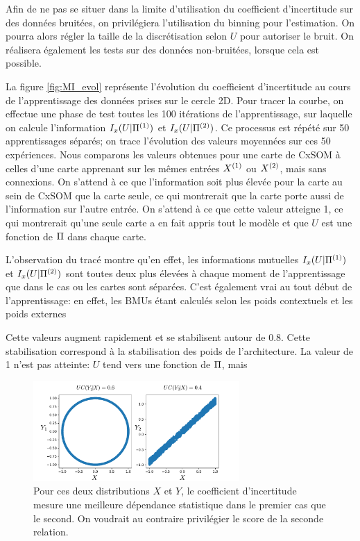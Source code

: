 Afin de ne pas se situer dans la limite d'utilisation du coefficient d'incertitude sur des données bruitées, on privilégiera l'utilisation du binning pour l'estimation. On pourra alors régler la taille de la discrétisation selon $U$ pour autoriser le bruit. On réalisera également les tests sur des données non-bruitées, lorsque cela est possible.

La figure \ref{fig:MI_evol} représente l'évolution du coefficient d'incertitude au cours de l'apprentissage des données prises sur le cercle 2D. Pour tracer la courbe, on effectue une phase de test toutes les 100 itérations de l'apprentissage, sur laquelle on calcule l'information $I_x(U|\Pi^{({1})})$ et $I_x(U|\Pi^{({2})})$. Ce processus est répété sur 50 apprentissages séparés; on trace l'évolution des valeurs moyennées sur ces 50 expériences.
Nous comparons les valeurs obtenues pour une carte de CxSOM à celles d'une carte apprenant sur les mêmes entrées $X^{({1})}$ ou $X^{({2})}$, mais sans connexions. On s'attend à ce que l'information soit plus élevée pour la carte au sein de CxSOM que la carte seule, ce qui montrerait que la carte porte aussi de l'information sur l'autre entrée. On s'attend à ce que cette valeur atteigne 1, ce qui montrerait qu'une seule carte a en fait appris tout le modèle et que $U$ est une fonction de $\Pi$ dans chaque carte.

L'observation du tracé montre qu'en effet, les informations mutuelles $I_x(U|\Pi^{({1})})$ et $I_x(U|\Pi^{({2})})$ sont toutes deux plus élevées à chaque moment de l'apprentissage que dans le cas ou les cartes sont séparées. C'est également vrai au tout début de l'apprentissage: en effet, les BMUs étant calculés selon les poids contextuels et les poids externes

Cette valeurs augment rapidement et se stabilisent autour de 0.8. Cette stabilisation correspond à la stabilisation des poids de l'architecture. La valeur de 1 n'est pas atteinte: $U$ tend vers une fonction de $\Pi$, mais 

\begin{figure}
\centering
\includegraphics[width=0.7\textwidth]{exemple_limite.pdf}
\caption{Pour ces deux distributions $X$ et $Y$, le coefficient d'incertitude mesure une meilleure dépendance statistique dans le premier cas que le second. On voudrait au contraire privilégier le score de la seconde relation.}
\label{fig:exemple-limite}
\end{figure}

